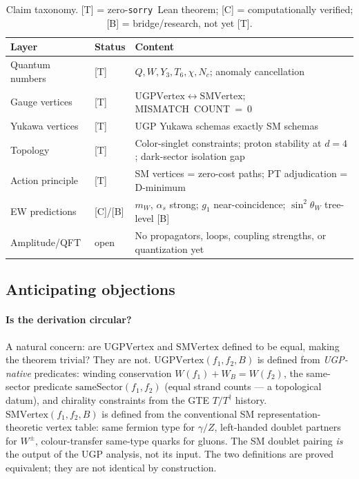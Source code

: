 \documentclass[12pt]{article}
\theoremstyle{remark}
\newcommand{\sinW}{\sin^2\!\theta_W}
\newcommand{\sorry}{\texttt{sorry}}
\begin{document}
\begin{table}[h]
\centering\small
\caption{Claim taxonomy.  [T] = zero-\sorry\ Lean theorem;
[C] = computationally verified; [B] = bridge/research, not yet [T].}
\label{tab:taxonomy}
\begin{tabular}{p{3.5cm}lp{7cm}}
\toprule
\textbf{Layer} & \textbf{Status} & \textbf{Content} \\
\midrule
Quantum numbers & [T] & $Q, W, Y_3, T_6, \chi, N_c$; anomaly cancellation \\
Gauge vertices & [T] & $\mathrm{UGPVertex} \leftrightarrow \mathrm{SMVertex}$; MISMATCH~COUNT~=~0 \\
Yukawa vertices & [T] & UGP Yukawa schemas exactly SM schemas \\
Topology & [T] & Color-singlet constraints; proton stability at $d=4$; dark-sector isolation gap \\
Action principle & [T] & SM vertices = zero-cost paths; PT adjudication = D-minimum \\
EW predictions & [C]/[B] & $m_W$, $\alpha_s$ strong; $g_1$ near-coincidence; $\sinW$ tree-level [B] \\
Amplitude/QFT & open & No propagators, loops, coupling strengths, or quantization yet \\
\bottomrule
\end{tabular}
\end{table}

\subsection{Anticipating objections}

\paragraph{Is the derivation circular?}
A natural concern: are $\mathrm{UGPVertex}$ and $\mathrm{SMVertex}$ defined to
be equal, making the theorem trivial?  They are not.
$\mathrm{UGPVertex}(f_1, f_2, B)$ is defined from \emph{UGP-native} predicates:
winding conservation $W(f_1) + W_B = W(f_2)$, the same-sector predicate
$\mathrm{sameSector}(f_1, f_2)$ (equal strand counts --- a topological datum),
and chirality constraints from the GTE $T/T^\dagger$ history.
$\mathrm{SMVertex}(f_1, f_2, B)$ is defined from the conventional SM
representation-theoretic vertex table: same fermion type for $\gamma/Z$,
left-handed doublet partners for $W^\pm$, colour-transfer same-type quarks for
gluons.  The SM doublet pairing \emph{is} the output of the UGP analysis, not
its input.  The two definitions are proved equivalent; they are not identical by
construction.
\end{document}
